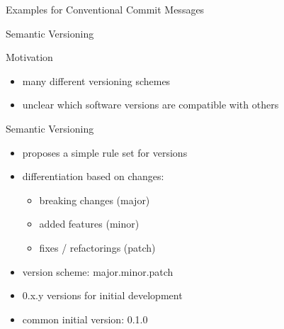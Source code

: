 \begin{frame}{Examples for Conventional Commit Messages}
	\centering{}
\end{frame}


\begin{frame}{Semantic Versioning}
	\begin{fancycolumns}
		
		
		\begin{note}{Motivation} 
			\begin{itemize}
				\item many different versioning schemes
				\item unclear which software versions are compatible with others
			\end{itemize}
		\end{note}
		
		\begin{definition}{Semantic Versioning } 
			\begin{itemize}
				\item proposes a simple rule set for versions
				\item differentiation based on changes:
				\begin{itemize}
					\item breaking changes (major)
					\item added features (minor)
					\item fixes / refactorings (patch)
				\end{itemize}
				\item version scheme: major.minor.patch
				\item 0.x.y versions for initial development
				\item common initial version: 0.1.0
			\end{itemize}
		\end{definition}
		\vspace{-1mm}
		

\end{fancycolumns}
\end{frame}
